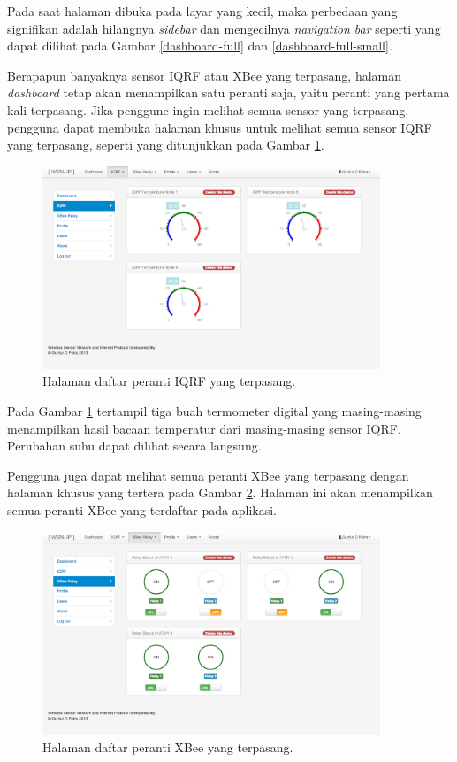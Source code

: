			Pada saat halaman dibuka pada layar yang kecil, maka perbedaan yang signifikan adalah hilangnya \emph{sidebar} dan mengecilnya \emph{navigation bar} seperti yang dapat dilihat pada Gambar \ref{dashboard-full} dan \ref{dashboard-full-small}.

			Berapapun banyaknya sensor IQRF atau XBee yang terpasang, halaman \emph{dashboard} tetap akan menampilkan satu peranti saja, yaitu peranti yang pertama kali terpasang. Jika penggune ingin melihat semua sensor yang terpasang, pengguna dapat membuka halaman khusus untuk melihat semua sensor IQRF yang terpasang, seperti yang ditunjukkan pada Gambar \ref{iqrf-list}.

				\begin{figure}[H]
				  \centering
				    \includegraphics[width=0.9\textwidth]{gambar/iqrf-list}
				    \caption{Halaman daftar peranti IQRF yang terpasang.}
				    \label{iqrf-list}
				\end{figure}

			Pada Gambar \ref{iqrf-list} tertampil tiga buah termometer digital yang masing-masing menampilkan hasil bacaan temperatur dari masing-masing sensor IQRF. Perubahan suhu dapat dilihat secara langsung.

			Pengguna juga dapat melihat semua peranti XBee yang terpasang dengan halaman khusus yang tertera pada Gambar \ref{xbee-list}. Halaman ini akan menampilkan semua peranti XBee yang terdaftar pada aplikasi.

				\begin{figure}[H]
				  \centering
				    \includegraphics[width=0.9\textwidth]{gambar/xbee-list}
				    \caption{Halaman daftar peranti XBee yang terpasang.}
				    \label{xbee-list}
				\end{figure}

